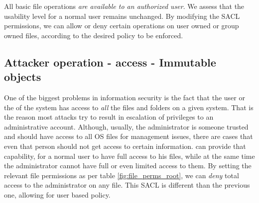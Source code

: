 \par All basic file operations \emph{are available to an authorized user}. We assess that the usability level for a normal user remains unchanged. By modifying the \ac{SACL} permissions, we can allow or deny certain operations on user owned or group owned files, according to the desired policy to be enforced.

\subsection{Attacker operation -  access - Immutable objects}

\par One of the biggest problems in information security is the fact that the  user or the  of the system has access to \emph{all} the files and folders on a given system. That is the reason most attacks try to result in escalation of privileges to an administrative account. Although, usually, the administrator is someone trusted and should have access to all \ac{OS} files for management issues, there are cases that even that person should not get access to certain information.  can provide that capability, for a normal user to have full access to his files, while at the same time the administrator cannot have full or even limited access to them. By setting the relevant file permissions as per table \ref{fig:file_perms_root}, we can \emph{deny} total access to the administrator on any file. This \ac{SACL} is different than the previous one, allowing for user based policy.

